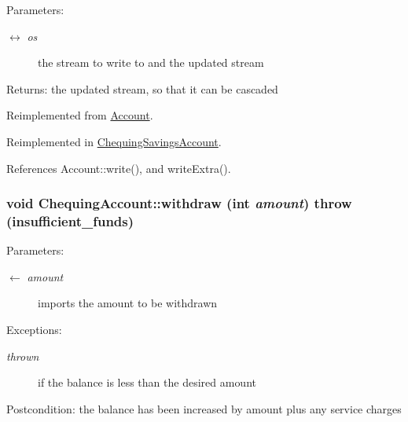 \begin{Desc}
\item[Parameters:]
\begin{description}
\item[\mbox{$\leftrightarrow$} {\em os}]the stream to write to and the updated stream \end{description}
\end{Desc}
\begin{Desc}
\item[Returns:]the updated stream, so that it can be cascaded \end{Desc}


Reimplemented from \hyperlink{classAccount_65f80b996aecc07bcb5ddd31fcb0b063}{Account}.

Reimplemented in \hyperlink{classChequingSavingsAccount_61888979bbaf273b2c20f92d2f41f226}{ChequingSavingsAccount}.

References Account::write(), and writeExtra().\hypertarget{classChequingAccount_14b54359ca8a5260b7decf0aa9bb04d2}{
\subsubsection[withdraw]{\setlength{\rightskip}{0pt plus 5cm}void ChequingAccount::withdraw (int {\em amount})  throw (insufficient\_\-funds)}}
\label{classChequingAccount_14b54359ca8a5260b7decf0aa9bb04d2}


\begin{Desc}
\item[Parameters:]
\begin{description}
\item[\mbox{$\leftarrow$} {\em amount}]imports the amount to be withdrawn \end{description}
\end{Desc}
\begin{Desc}
\item[Exceptions:]
\begin{description}
\item[{\em thrown}]if the balance is less than the desired amount \end{description}
\end{Desc}
\begin{Desc}
\item[Postcondition:]the balance has been increased by amount plus any service charges \end{Desc}


